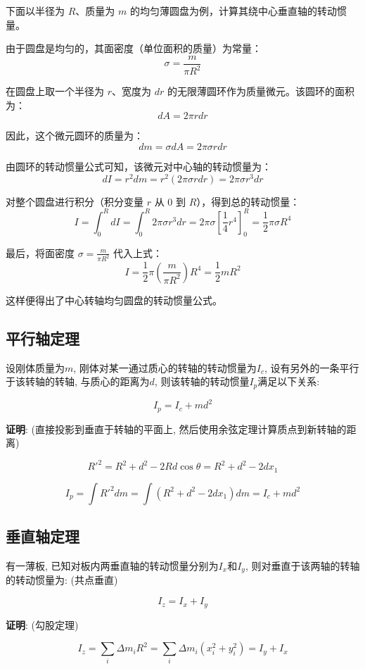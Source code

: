 \documentclass[
  a4paper,
]{ctexrep}
\begin{document}
下面以半径为 \(R\)、质量为 \(m\)
的均匀薄圆盘为例，计算其绕中心垂直轴的转动惯量。

由于圆盘是均匀的，其面密度（单位面积的质量）为常量： \[
\sigma = \frac{m}{\pi R^2}
\]

在圆盘上取一个半径为 \(r\)、宽度为 \(dr\)
的无限薄圆环作为质量微元。该圆环的面积为： \[
dA = 2\pi r dr
\]

因此，这个微元圆环的质量为： \[
dm = \sigma dA = 2\pi \sigma r dr
\]

由圆环的转动惯量公式可知，该微元对中心轴的转动惯量为： \[
dI = r^2 dm = r^2 (2\pi \sigma r dr) = 2\pi \sigma r^3 dr
\]

对整个圆盘进行积分（积分变量 \(r\) 从 \(0\) 到
\(R\)），得到总的转动惯量： \[
I = \int_{0}^{R} dI = \int_{0}^{R} 2\pi \sigma r^3 dr = 2\pi \sigma \left[ \frac{1}{4} r^4 \right]_{0}^{R} = \frac{1}{2} \pi \sigma R^4
\]

最后，将面密度 \(\sigma = \frac{m}{\pi R^2}\) 代入上式： \[
I = \frac{1}{2} \pi \left( \frac{m}{\pi R^2} \right) R^4 = \frac{1}{2}mR^2
\]

这样便得出了中心转轴均匀圆盘的转动惯量公式。

\subsection{平行轴定理}\label{ux5e73ux884cux8f74ux5b9aux7406}

设刚体质量为\(m\), 刚体对某一通过质心的转轴的转动惯量为\(I_c\),
设有另外的一条平行于该转轴的转轴, 与质心的距离为\(d\),
则该转轴的转动惯量\(I_p\)满足以下关系:

\[
I_p = I_c + md^2
\]

\textbf{证明}: (直接投影到垂直于转轴的平面上,
然后使用余弦定理计算质点到新转轴的距离)

\[
R'^2 = R^2 + d^2 - 2Rd\cos\theta = R^2 + d^2 -2 d x_1
\]

\[
I_p = \int R'^2 dm = \int (R^2 + d^2 - 2 d x_1) dm = I_c + md^2
\]

\subsection{垂直轴定理}\label{ux5782ux76f4ux8f74ux5b9aux7406}

有一薄板, 已知对板内两垂直轴的转动惯量分别为\(I_x\)和\(I_y\),
则对垂直于该两轴的转轴的转动惯量为: (共点垂直)

\[
I_z = I_x + I_y
\]

\textbf{证明}: (勾股定理)

\[
I_z = \sum_i \Delta m_i R^2 = \sum_i \Delta m_i (x_i^2 + y_i^2) = I_y + I_x
\]
\end{document}
